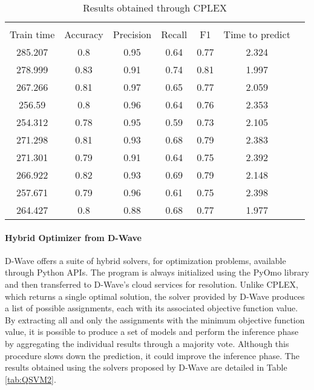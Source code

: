 \begin{table}[H]
    \centering
    \begin{tabular}{ccccccc}
    \toprule                                                             \\                    
    Train time & Accuracy & Precision & Recall & F1    & Time to predict \\
    \midrule
    285.207    & 0.8      & 0.95      & 0.64   & 0.77  & 2.324           \\
    278.999    & 0.83     & 0.91      & 0.74   & 0.81  & 1.997           \\
    267.266    & 0.81     & 0.97      & 0.65   & 0.77  & 2.059           \\
    256.59     & 0.8      & 0.96      & 0.64   & 0.76  & 2.353           \\
    254.312    & 0.78     & 0.95      & 0.59   & 0.73  & 2.105           \\
    271.298    & 0.81     & 0.93      & 0.68   & 0.79  & 2.383           \\
    271.301    & 0.79     & 0.91      & 0.64   & 0.75  & 2.392           \\
    266.922    & 0.82     & 0.93      & 0.69   & 0.79  & 2.148           \\
    257.671    & 0.79     & 0.96      & 0.61   & 0.75  & 2.398           \\
    264.427    & 0.8      & 0.88      & 0.68   & 0.77  & 1.977           \\
    \bottomrule
    \end{tabular}
    \caption{Results obtained through CPLEX}
    \label{tab:QSVM1}
\end{table}

\paragraph{Hybrid Optimizer from D-Wave} D-Wave offers a suite of hybrid solvers, for optimization problems, available through Python APIs\cite{hss}. The program is always initialized using the PyOmo library and then transferred to D-Wave's cloud services for resolution. Unlike CPLEX, which returns a single optimal solution, the solver provided by D-Wave produces a list of possible assignments, each with its associated objective function value. By extracting all and only the assignments with the minimum objective function value, it is possible to produce a set of models and perform the inference phase by aggregating the individual results through a majority vote. Although this procedure slows down the prediction, it could improve the inference phase. The results obtained using the solvers proposed by D-Wave are detailed in Table \ref{tab:QSVM2}.

